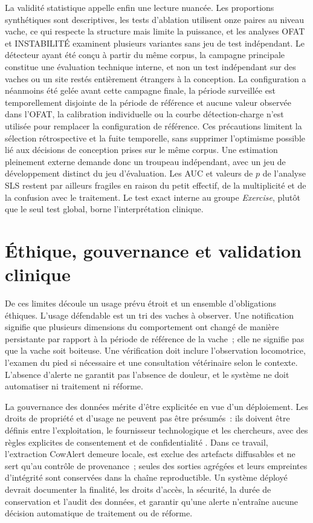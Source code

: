 La validité statistique appelle enfin une lecture nuancée. Les proportions synthétiques sont
descriptives, les tests d'ablation utilisent onze paires au niveau vache, ce qui respecte la
structure mais limite la puissance, et les analyses OFAT et INSTABILITÉ examinent plusieurs
variantes sans jeu de test indépendant. Le détecteur ayant été conçu à partir du même corpus,
la campagne principale constitue une évaluation technique interne, et non un test indépendant
sur des vaches ou un site restés entièrement étrangers à la conception. La configuration a
néanmoins été gelée avant cette campagne finale, la période surveillée est temporellement
disjointe de la période de référence et aucune valeur observée dans l'OFAT, la calibration
individuelle ou la courbe détection-charge n'est utilisée pour remplacer la configuration de
référence. Ces précautions limitent la sélection rétrospective et la fuite temporelle, sans
supprimer l'optimisme possible lié aux décisions de conception prises sur le même corpus. Une
estimation pleinement externe demande donc un troupeau indépendant, avec un jeu de
développement distinct du jeu d'évaluation. Les AUC et valeurs de $p$ de l'analyse SLS restent
par ailleurs fragiles en raison du petit effectif, de la multiplicité et de la confusion
avec le traitement. Le test exact interne au groupe \textit{Exercise}, plutôt que le seul
test global, borne l'interprétation clinique.

\section{Éthique, gouvernance et validation clinique}
De ces limites découle un usage prévu étroit et un ensemble d'obligations éthiques. L'usage
défendable est un tri des vaches à observer. Une notification signifie que plusieurs
dimensions du comportement ont changé de manière persistante par rapport à la période de
référence de la vache~; elle ne signifie pas que la vache soit boiteuse. Une vérification doit
inclure l'observation locomotrice, l'examen du pied si nécessaire et une consultation
vétérinaire selon le contexte. L'absence d'alerte ne garantit pas l'absence de douleur, et le
système ne doit automatiser ni traitement ni réforme.

La gouvernance des données mérite d'être explicitée en vue d'un déploiement. Les droits de
propriété et d'usage ne peuvent pas être présumés~: ils doivent être définis entre
l'exploitation, le fournisseur technologique et les chercheurs, avec des règles explicites de
consentement et de confidentialité \citep{wolfert2017big,carbonell2016ethics}. Dans ce
travail, l'extraction CowAlert demeure locale, est exclue des artefacts diffusables et ne sert
qu'au contrôle de provenance~; seules des sorties agrégées et leurs empreintes d'intégrité
sont conservées dans la chaîne reproductible. Un système déployé devrait documenter la
finalité, les droits d'accès, la sécurité, la durée de conservation et l'audit des données, et
garantir qu'une alerte n'entraîne aucune décision automatique de traitement ou de réforme.

